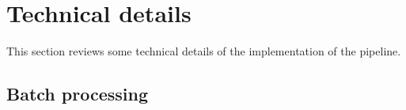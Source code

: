 \section{Technical details}\label{chap:tech}
This section reviews some technical details of the implementation of the pipeline.


\subsection{Batch processing}\label{sec:batchp}